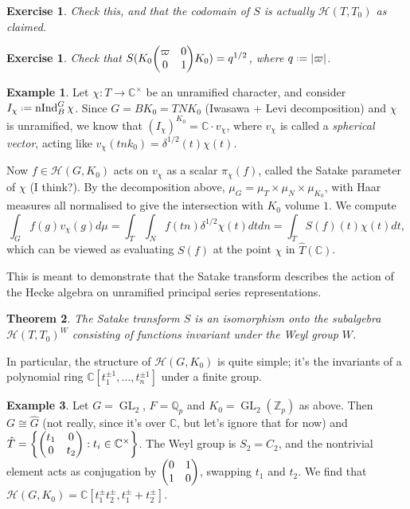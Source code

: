\documentclass[11pt]{report}
\let\mc\mathcal
\newcommand{\1}{\mathbbm 1}
\newcommand{\Z}{\mathbb{Z}}
\newcommand{\Q}{\mathbb{Q}}
\newcommand{\C}{\mathbb{C}}
\newcommand*{\defeq}{\mathrel{\vcenter{\baselineskip0.5ex \lineskiplimit0pt
      \hbox{\scriptsize.}\hbox{\scriptsize.}}}%
  =}
\DeclareMathOperator{\nInd}{nInd}
\DeclareMathOperator{\GL}{GL}
\theoremstyle{plain}
\newtheorem{thm}{Theorem}[section]
\newcounter{ex}
\newtheorem{exercise}[ex]{Exercise}
\theoremstyle{definition}
\newtheorem{example}[thm]{Example}
\theoremstyle{remark}
\numberwithin{equation}{section}
\begin{document}
\begin{exercise}
  Check this, and that the codomain of $S$ is actually
  $\mc H(T,T_{0})$ as claimed.
\end{exercise}

\begin{exercise}
  Check that $S(K_{0}\mqty(\varpi & 0 \\ 0 & 1)K_{0} ) = q^{1/2}$,
  where $q \defeq |\varpi|$.
\end{exercise}
\begin{example}
  Let $\chi \colon T \to \C^{\times}$ be an unramified character, and consider
  $I_{\chi} \defeq \nInd_{B}^{G} \chi$. Since $G = BK_{0} = TNK_{0}$
  (Iwasawa + Levi decomposition) and $\chi$ is unramified, we know that
  $(I_{\chi})^{K_{0}} = \C \cdot v_{\chi}$, where $v_{\chi}$ is called a \emph{spherical
    vector}, acting like $v_{\chi}(tnk_{0}) = \delta^{1/2}(t)\chi(t)$.

  Now $f \in \mc H(G,K_{0})$ acts on $v_{\chi}$ as a scalar
  $\pi_{\chi}(f)$, called the Satake parameter of $\chi$ (I think?). By the
  decomposition above,
  $\mu_{G} = \mu_{T}\times \mu_{N}\times \mu_{K_{0}}$, with Haar measures all normalised to give the intersection with $K_{0}$ volume $1$. We compute
  \begin{equation}
    \label{eq:satake-compu}
    \int_{G}f(g)v_{\chi}(g)d\mu = \int_{T}\int_{N}f(tn) \delta^{1/2}\chi(t)dtdn = \int_{T} S(f)(t)\chi(t)dt,
  \end{equation}
  which can be viewed as evaluating $S(f)$ at the point $\chi$ in $\hat T(\C)$.
\end{example}
This is meant to demonstrate that the Satake transform describes the action of the Hecke algebra on unramified principal series representations.

\begin{thm}
The Satake transform $S$ is an isomorphism onto the subalgebra $\mc H(T,T_{0})^{W}$ consisting of functions invariant under the Weyl group $W$. 
\end{thm}
In particular, the structure of $\mc H(G,K_{0})$ is quite simple; it's the invariants of a polynomial ring $\C[t_{1}^{\pm 1},\ldots, t_{n}^{\pm 1}]$ under a finite group. 

\begin{example}
  Let $G = \GL_{2}$, $F = \Q_{p}$ and $K_{0} = \GL_{2}(\Z_{p})$ as
  above. Then $G \cong \hat G$ (not really, since it's over $\C$, but
  let's ignore that for now) and
  $\hat T = \qty{\mqty(t_{1} & 0 \\ 0 & t_{2}) : t_{i} \in \C^{\times}}$. The
  Weyl group is $S_{2} = C_{2}$, and the nontrivial element acts as conjugation by
  $\mqty(0 & 1 \\ 1 & 0)$, swapping $t_{1}$ and $t_{2}$.  We find that
  $\mc H(G,K_{0}) = \C[t_{1}^{\pm}t_{2}^{\pm}, t_{1}^{\pm} + t_{2}^{\pm}]$.
\end{example}
\end{document}
